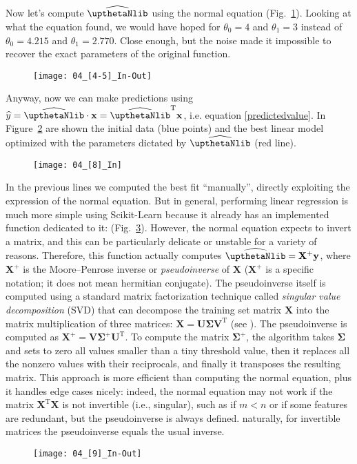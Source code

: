 Now let's compute $\widehat{\boldtheta}$ using the normal equation (Fig.~\ref{04_[4-5]_In-Out}). Looking at what the equation found, we would have hoped for $\theta_0=4$ and $\theta_1=3$ instead of $\theta_0=4.215$ and $\theta_1=2.770$. Close enough, but the noise made it impossible to recover the exact parameters of the original function.
\begin{figure}[h!t]
\centering
\texttt{[image: 04\_[4-5]\_In-Out]}
\caption{}\label{04_[4-5]_In-Out}
\end{figure}

Anyway, now we can make predictions using $\widehat{y}=\widehat{\boldtheta}\cdot\mathbf{x}=\widehat{\boldtheta}^{\mathrm{T}}\mathbf{x}$, i.e. equation \eqref{predictedvalue}. In Figure~\ref{04_[8]_In} are shown the initial data (blue points) and the best linear model optimized with the parameters dictated by $\widehat{\boldtheta}$ (red line).
\begin{figure}[h!t]
\centering
\texttt{[image: 04\_[8]\_In]}
\caption{}\label{04_[8]_In}
\end{figure}

In the previous lines we computed the best fit ``manually'', directly exploiting the expression of the normal equation. But in general, performing linear regression is much more simple using Scikit-Learn because it already has an implemented function dedicated to it:  (Fig.~\ref{04_[9]_In-Out}). However, the normal equation expects to invert a matrix, and this can be particularly delicate or unstable for a variety of reasons. Therefore, this function actually computes $\widehat{\boldtheta}=\mathbf{X}^+\mathbf{y}$, where $\mathbf{X}^+$ is the Moore--Penrose inverse or \emph{pseudoinverse} of $\mathbf{X}$ ($\mathbf{X}^+$ is a specific notation; it does not mean hermitian conjugate). The pseudoinverse itself is computed using a standard matrix factorization technique called \emph{singular value decomposition} (SVD) that can decompose the training set matrix $\mathbf{X}$ into the matrix multiplication of three matrices: $\mathbf{X}=\mathbf{U}\boldsymbol{\Sigma}\mathbf{V}^{\mathrm{T}}$ (see ). The pseudoinverse is computed as $\mathbf{X}^+=\mathbf{V}\boldsymbol{\Sigma}^+\mathbf{U}^{\mathrm{T}}$. To compute the matrix $\boldsymbol{\Sigma}^+$, the algorithm takes $\boldsymbol{\Sigma}$ and sets to zero all values smaller than a tiny threshold value, then it replaces all the nonzero values with their reciprocals, and finally it transposes the resulting matrix. This approach is more efficient than computing the normal equation, plus it handles edge cases nicely: indeed, the normal equation may not work if the matrix $\mathbf{X}^{\mathrm{T}}\mathbf{X}$ is not invertible (i.e., singular), such as if $m<n$ or if some features are redundant, but the pseudoinverse is always defined. naturally, for invertible matrices the pseudoinverse equals the usual inverse.
\begin{figure}[h!t]
\centering
\texttt{[image: 04\_[9]\_In-Out]}
\caption{}\label{04_[9]_In-Out}
\end{figure}

